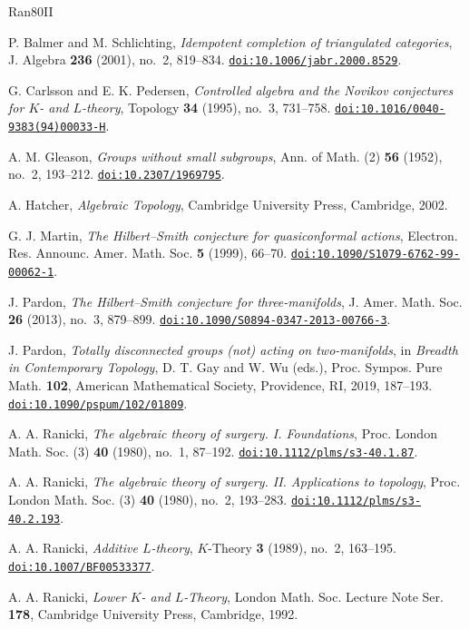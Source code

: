 \documentclass[11pt]{amsart}
\newcommand{\doi}[1]{\href{https://doi.org/#1}{\nolinkurl{doi:#1}}}
\numberwithin{equation}{section}
\theoremstyle{definition}
\theoremstyle{remark}
\begin{document}
\begin{thebibliography}{Ran80II}

P. Balmer and M. Schlichting,
\emph{Idempotent completion of triangulated categories},
J. Algebra \textbf{236} (2001), no.~2, 819--834.
\doi{10.1006/jabr.2000.8529}.

G. Carlsson and E. K. Pedersen,
\emph{Controlled algebra and the Novikov conjectures for $K$- and $L$-theory},
Topology \textbf{34} (1995), no.~3, 731--758.
\doi{10.1016/0040-9383(94)00033-H}.

A. M. Gleason,
\emph{Groups without small subgroups},
Ann. of Math. (2) \textbf{56} (1952), no.~2, 193--212.
\doi{10.2307/1969795}.

A. Hatcher,
\emph{Algebraic Topology},
Cambridge University Press, Cambridge, 2002.

G. J. Martin,
\emph{The Hilbert--Smith conjecture for quasiconformal actions},
Electron. Res. Announc. Amer. Math. Soc. \textbf{5} (1999), 66--70.
\doi{10.1090/S1079-6762-99-00062-1}.

J. Pardon,
\emph{The Hilbert--Smith conjecture for three-manifolds},
J. Amer. Math. Soc. \textbf{26} (2013), no.~3, 879--899.
\doi{10.1090/S0894-0347-2013-00766-3}.

J. Pardon,
\emph{Totally disconnected groups (not) acting on two-manifolds},
in \emph{Breadth in Contemporary Topology}, D. T. Gay and W. Wu (eds.),
Proc. Sympos. Pure Math. \textbf{102}, American Mathematical Society,
Providence, RI, 2019, 187--193.
\doi{10.1090/pspum/102/01809}.

A. A. Ranicki,
\emph{The algebraic theory of surgery. I. Foundations},
Proc. London Math. Soc. (3) \textbf{40} (1980), no.~1, 87--192.
\doi{10.1112/plms/s3-40.1.87}.

A. A. Ranicki,
\emph{The algebraic theory of surgery. II. Applications to topology},
Proc. London Math. Soc. (3) \textbf{40} (1980), no.~2, 193--283.
\doi{10.1112/plms/s3-40.2.193}.

A. A. Ranicki,
\emph{Additive $L$-theory},
$K$-Theory \textbf{3} (1989), no.~2, 163--195.
\doi{10.1007/BF00533377}.

A. A. Ranicki,
\emph{Lower $K$- and $L$-Theory},
London Math. Soc. Lecture Note Ser. \textbf{178},
Cambridge University Press, Cambridge, 1992.


\end{thebibliography}
\end{document}
